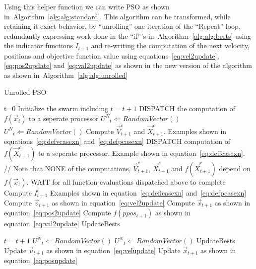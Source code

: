 \documentclass[journal,letterpaper]{IEEEtran}
\newcommand{\alg}[1]{Algorithm~\ref{alg:#1}}
\providecommand{\pers}{\ensuremath{P}}
\providecommand{\neigh}{\ensuremath{N}}
\providecommand{\nURand}{\ensuremath{U^\neigh}}
\providecommand{\ppos}{\ensuremath{\Vec{x}}}
\providecommand{\pvel}{\ensuremath{\Vec{v}}}
\providecommand{\fnbest}{\ensuremath{\Vec{fb}^\neigh}}
\providecommand{\fpbest}{\ensuremath{\Vec{fb}^\pers}}
\providecommand{\ofunc}{\ensuremath{f}}
\providecommand{\swarm}{\ensuremath{swarm}}
\providecommand{\indic}{\ensuremath{I}}
\providecommand{\specvel}{\ensuremath{\vec{V}}}
\providecommand{\specpos}{\ensuremath{\vec{X}}}
\providecommand{\caseset}{\ensuremath{\mathcal{C}}}
\begin{document}
Using this helper function we can write PSO as shown in~\alg{alg:standard}.
This algorithm can be transformed, while retaining it exact behavior, by
``unrolling'' one iteration of the ``Repeat'' loop, redundantly expressing work done in the ``if'''s
in~\alg{alg:bests}
using the indicator functions $\indic_{t+1}$ and re-writing the computation of the next velocity,
positions and objective function value using 
equations~\eqref{eq:vel2update}, \eqref{eq:pos2update} and \eqref{eq:val2update} 
as shown in the new version of the algorithm as shown in~\alg{alg:unrolled}

\begin{algorithm} [h!]
  \caption{Unrolled PSO}
  \label{alg:unrolled}
  \begin{algorithmic}[1]
    \STATE t=0
    \STATE Initialize the swarm including
    \REPEAT
        \STATE $t=t+1$
          \label{alg2:fatitert}
          \STATE DISPATCH the computation of {$\ofunc(\ppos_{t})$} to a seperate processor
        \ENDFOR
          \STATE $\nURand_{t} \Leftarrow RandomVector()$
          \STATE $\nURand_{t} \Leftarrow RandomVector()$
          \FOR{$c \in \caseset$}
            \STATE Compute $\specvel_{t+1}^c$ and $\specpos_{t+1}^c$.
	    Examples shown in equations~\eqref{eq:defvcasexn} and~\eqref{eq:defpcasexn}
            \label{alg2:fatitertp1}
            \STATE DISPATCH computation of $\ofunc(\specpos_{t+1}^c)$ to a seperate processor.
	    Example shown in equation~\eqref{eq:deffcasexn}.
	    // Note that NONE of the computations, $\specvel_{t+1}^c$,
	    $\specpos_{t+1}^c$ and $\ofunc(\specpos_{t+1}^c)$ depend on $\ofunc(\ppos_{t})$.
          \ENDFOR
        \ENDFOR
        \STATE WAIT for all function evaluations dispatched above to complete
          \FOR{$c \in \caseset$}
            \STATE Compute $\indic_{t+1}^c$
	           Examples shown in equation~\eqref{eq:deficasexn} and~\eqref{eq:defpcasexn}
	  \ENDFOR 
            \label{alg2:startcut}
          \STATE Compute $\pvel_{t+1}$ as shown in equation~\eqref{eq:vel2update} 
          \STATE Compute $\ppos_{t+1}$ as shown in equation~\eqref{eq:pos2update}
          \STATE Compute $\ofunc(ppos_{t+1})$ as shown in equation~\eqref{eq:val2update}
	  \STATE UpdateBests
            \label{alg2:endcut}
        \ENDFOR

        \STATE $t=t+1$
          \STATE $\nURand_{t} \Leftarrow RandomVector()$
          \STATE $\nURand_{t} \Leftarrow RandomVector()$
          \STATE UpdateBests
          \STATE Update $\pvel_{t+1}$ as shown in equation~\eqref{eq:velupdate} 
          \STATE Update $\ppos_{t+1}$ as shown in equation~\eqref{eq:posupdate}
        \ENDFOR
  \end{algorithmic}
\end{algorithm}
\end{document}
